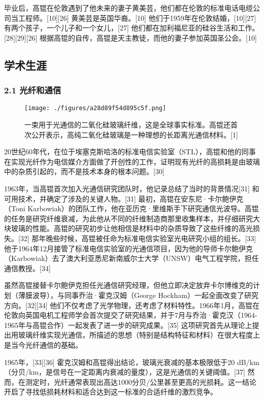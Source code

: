 毕业后，高锟在伦敦遇到了他未来的妻子黄美芸，他们都在伦敦的标准电话电缆公司当工程师。[10][26] 黄美芸是英国华裔。[10] 他们于1959年在伦敦结婚，[10][27] 有两个孩子，一个儿子和一个女儿，[27] 他们都在加利福尼亚的硅谷生活和工作。[28][29][26] 根据高锟的自传，高锟是天主教徒，而他的妻子参加英国圣公会。[10]

\subsection{学术生涯}
\subsubsection{2.1 光纤和通信}
\begin{figure}[ht]
\centering
\texttt{[image: ./figures/a28d89f54d895c5f.png]}
\caption{一束用于光通信的二氧化硅玻璃纤维，这是全球事实标准。高锟还首次公开表示，高纯二氧化硅玻璃是一种理想的长距离光通信材料。[1]} \label{fig_GK_1}
\end{figure}
20世纪60年代，在位于埃塞克斯哈洛的标准电信实验室（STL），高锟和他的同事在实现光纤作为电信媒介方面做了开创性的工作，证明现有光纤的高损耗是由玻璃中的杂质引起的，而不是技术本身的根本问题。[30]

1963年，当高锟首次加入光通信研究团队时，他记录总结了当时的背景情况[31] 和可用技术，并确定了涉及的关键人物。[31] 最初，高锟在安东尼·卡尔鲍伊克（Toni Karbowiak）的团队工作，他在亚历克·里维斯手下研究通信光波导。高锟的任务是研究纤维衰减，为此他从不同的纤维制造商那里收集样本，并仔细研究大块玻璃的性能。高锟的研究初步让他相信是材料中的杂质导致了这些纤维的高光损失。[32] 那年晚些时候，高锟被任命为标准电信实验室光电研究小组的组长。[33] 他于1964年12月接管了标准电信实验室的光通信项目，因为他的导师卡尔鲍伊克（Karbowiak）去了澳大利亚悉尼新南威尔士大学（UNSW）电气工程学院，担任通信教授。[34]

虽然高锟接替卡尔鲍伊克担任光通信研究经理，但他立即决定放弃卡尔博维克的计划（薄膜波导），与同事乔治·霍克汉姆（George Hockham）一起全面改变了研究方向。[32][34] 他们不仅考虑了光学物理，还考虑了材料特性。1966年1月，高锟在伦敦向英国电机工程师学会首次提交了研究结果，并于7月与乔治·霍克汉（1964-1965年与高锟合作）一起发表了进一步的研究成果。[35] 这项研究首先从理论上提出用玻璃纤维实现光通信，所描述的思想（特别是结构特征和材料）在很大程度上是当今光纤通信的基础。

1965年，[33][36] 霍克汉姆和高锟得出结论，玻璃光衰减的基本极限低于20 dB/km（分贝/km，是信号在一定距离内衰减的量度），这是光通信的关键阈值。[37] 然而，在测定时，光纤通常表现出高达1000分贝/公里甚至更高的光损耗。这一结论开启了寻找低损耗材料和适合达到这一标准的合适纤维的激烈竞争。

